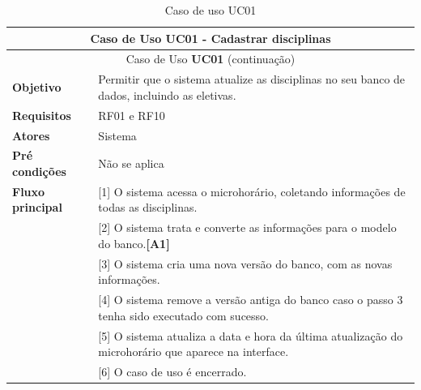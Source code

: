 \begin{longtable}{ | m{} | m{} | }
    \hline\hline
    \multicolumn{2}{|c|}{Caso de Uso \textbf{UC01} - Cadastrar disciplinas}\tabularnewline\hline\hline\endfirsthead
    \hline\hline
    \multicolumn{2}{|c|}{Caso de Uso \textbf{UC01} (continuação)}\tabularnewline\hline\hline\endhead
    \hline\endfoot
    \hline\caption{Caso de uso UC01}\endlastfoot

    \textbf{Objetivo} & Permitir que o sistema atualize as disciplinas no seu banco de dados, incluindo as eletivas.\tabularnewline\hline 
    \textbf{Requisitos} & RF01 e RF10\tabularnewline\hline
    \textbf{Atores} & Sistema\tabularnewline\hline
    \textbf{Pré condições} & Não se aplica\tabularnewline\hline

    \multirow{1}{*}{\textbf{Fluxo principal}} & [1] O sistema acessa o microhorário, coletando informações de todas as disciplinas.\tabularnewline\cline{2-2}
    & [2] O sistema trata e converte as informações para o modelo do banco.\textbf{[A1]}\tabularnewline\cline{2-2}
    & [3] O sistema cria uma nova versão do banco, com as novas informações.\tabularnewline\cline{2-2}
    & [4] O sistema remove a versão antiga do banco caso o passo 3 tenha sido executado com sucesso.\tabularnewline\cline{2-2}
    & [5] O sistema atualiza a data e hora da última atualização do microhorário que aparece na interface.\tabularnewline\cline{2-2}
    & [6] O caso de uso é encerrado.
    \label{tab:uc01}
\end{longtable}



